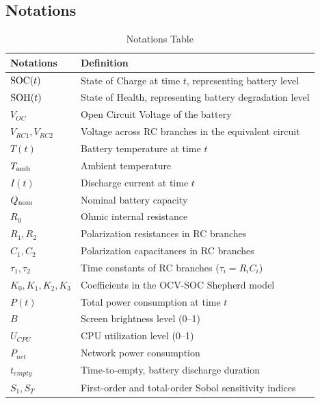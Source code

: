 \subsection{Notations}
\label{subsec:notation}

\begin{table}[H]
    \centering
    \caption{Notations Table}
    \label{tab:notations}
    \begin{tabular}{@{}ll@{}}
        \toprule
        \textbf{Notations} & \textbf{Definition} \\
        \midrule
        $\text{SOC}(t)$ & State of Charge at time $t$, representing battery level \\
        $\text{SOH}(t)$ & State of Health, representing battery degradation level \\
        $V_{OC}$ & Open Circuit Voltage of the battery \\
        $V_{RC1}, V_{RC2}$ & Voltage across RC branches in the equivalent circuit \\
        $T(t)$ & Battery temperature at time $t$ \\
        $T_{\text{amb}}$ & Ambient temperature \\
        $I(t)$ & Discharge current at time $t$ \\
        $Q_{\text{nom}}$ & Nominal battery capacity \\
        $R_0$ & Ohmic internal resistance \\
        $R_1, R_2$ & Polarization resistances in RC branches \\
        $C_1, C_2$ & Polarization capacitances in RC branches \\
        $\tau_1, \tau_2$ & Time constants of RC branches ($\tau_i = R_i C_i$) \\
        $K_0, K_1, K_2, K_3$ & Coefficients in the OCV-SOC Shepherd model \\
        $P(t)$ & Total power consumption at time $t$ \\
        $B$ & Screen brightness level (0--1) \\
        $U_{CPU}$ & CPU utilization level (0--1) \\
        $P_{net}$ & Network power consumption \\
        $t_{empty}$ & Time-to-empty, battery discharge duration \\
        $S_1, S_T$ & First-order and total-order Sobol sensitivity indices \\
        \bottomrule
    \end{tabular}
\end{table}

